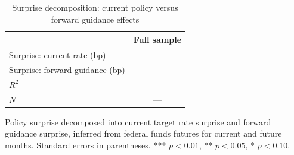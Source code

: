 \begin{table}[t]
\centering
\begin{threeparttable}
\caption{Surprise decomposition: current policy versus forward guidance effects}
\label{tab:decomposition}
\begin{tabular}{lc}
\toprule
 & Full sample \\
\midrule
Surprise: current rate (bp) & --- \\
Surprise: forward guidance (bp) & --- \\
$R^2$ & --- \\
$N$ & --- \\
\bottomrule
\end{tabular}
\begin{tablenotes}[flushleft]
\footnotesize
\item Policy surprise decomposed into current target rate surprise and forward guidance surprise, inferred from federal funds futures for current and future months. Standard errors in parentheses. *** $p<0.01$, ** $p<0.05$, * $p<0.10$.
\end{tablenotes}
\end{threeparttable}
\end{table}
